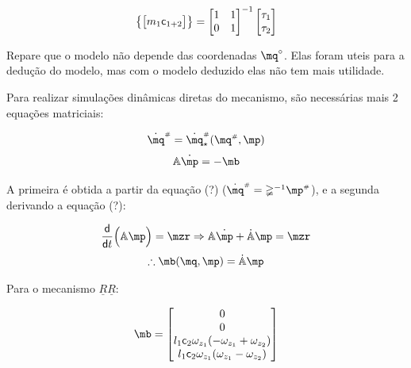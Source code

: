 \begin{itemize}
\begin{itemize}
\begin{equation}
\begin{Bmatrix}
\begin{bmatrix}
		m_1  \mathsf{c}_{1+2}\\
		\end{bmatrix}
	\end{Bmatrix}
	=
	\begin{bmatrix}
	1 & 1 \\
	0 & 1 \\
	\end{bmatrix}^{-1}
	\begin{bmatrix}
	\tau_{1} \\
	\tau_{2} \\
	\end{bmatrix}
	\end{equation}
	
	Repare que o modelo não depende das coordenadas $\mq^\circ$. Elas foram uteis para a dedu\c{c}\~ao do modelo, mas com o modelo deduzido elas não tem mais utilidade.
	
	Para realizar simulações dinâmicas diretas do mecanismo, são necessárias mais 2 equações matriciais:
	
	\begin{equation}
	\dot{\mq}\ssh = \dot{\mq}\ssh_\star (\mq\ssh, \mp)
	\end{equation}
	\begin{equation}
	\mA \dot{\mp} = -\mb
	\end{equation}
	
	A primeira é obtida a partir da equação (?) ($\dot{\mq}\ssh  = \mathbb{\Psi}^{-1} \mp\ssh $), e a segunda derivando a equação (?):
	
	$$ \frac{\dd }{\dd t} \Big( \mA \mp  \Big) = \mzr \Rightarrow \mA \dot{\mp} + \dot{ \mA} \mp  = \mzr  $$
	\begin{equation}
	\therefore \mb (\mq, \mp) = \dot{ \mA} \mp 
	\end{equation}
	
	Para o mecanismo $\underline{R}\underline{R}$:
	
	\begin{equation}
	\mb = \begin{bmatrix}
	0 \\
	0 \\
	l_1 \ccos_2 \omega_{z_1} (-\omega_{z_1} + \omega_{z_2}) \\
	l_1 \ccos_2 \omega_{z_1} (\omega_{z_1} - \omega_{z_2})
	\end{bmatrix}
	\end{equation}
	
	
	
	
	\end{itemize}
\end{itemize}

